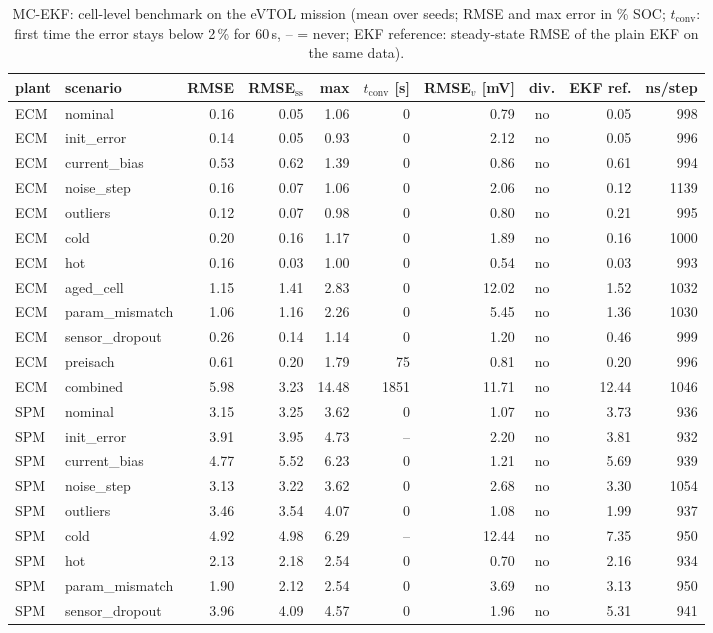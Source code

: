 \begin{table}[H]\centering\footnotesize\setlength{\tabcolsep}{4pt}
\caption{MC-EKF: cell-level benchmark on the eVTOL mission (mean over seeds; RMSE and max error in \% SOC; $t_\mathrm{conv}$: first time the error stays below 2\,\% for 60\,s, -- = never; EKF reference: steady-state RMSE of the plain EKF on the same data).}\label{tab:cell_MCEKF}
\begin{tabular}{llrrrrrcrr}\toprule
plant & scenario & RMSE & RMSE$_\mathrm{ss}$ & max & $t_\mathrm{conv}$ [s] & RMSE$_v$ [mV] & div. & EKF ref. & ns/step \\ \midrule
ECM & nominal & 0.16 & 0.05 & 1.06 & 0 & 0.79 & no & 0.05 & 998 \\
ECM & init\_error & 0.14 & 0.05 & 0.93 & 0 & 2.12 & no & 0.05 & 996 \\
ECM & current\_bias & 0.53 & 0.62 & 1.39 & 0 & 0.86 & no & 0.61 & 994 \\
ECM & noise\_step & 0.16 & 0.07 & 1.06 & 0 & 2.06 & no & 0.12 & 1139 \\
ECM & outliers & 0.12 & 0.07 & 0.98 & 0 & 0.80 & no & 0.21 & 995 \\
ECM & cold & 0.20 & 0.16 & 1.17 & 0 & 1.89 & no & 0.16 & 1000 \\
ECM & hot & 0.16 & 0.03 & 1.00 & 0 & 0.54 & no & 0.03 & 993 \\
ECM & aged\_cell & 1.15 & 1.41 & 2.83 & 0 & 12.02 & no & 1.52 & 1032 \\
ECM & param\_mismatch & 1.06 & 1.16 & 2.26 & 0 & 5.45 & no & 1.36 & 1030 \\
ECM & sensor\_dropout & 0.26 & 0.14 & 1.14 & 0 & 1.20 & no & 0.46 & 999 \\
ECM & preisach & 0.61 & 0.20 & 1.79 & 75 & 0.81 & no & 0.20 & 996 \\
ECM & combined & 5.98 & 3.23 & 14.48 & 1851 & 11.71 & no & 12.44 & 1046 \\
\midrule
SPM & nominal & 3.15 & 3.25 & 3.62 & 0 & 1.07 & no & 3.73 & 936 \\
SPM & init\_error & 3.91 & 3.95 & 4.73 & -- & 2.20 & no & 3.81 & 932 \\
SPM & current\_bias & 4.77 & 5.52 & 6.23 & 0 & 1.21 & no & 5.69 & 939 \\
SPM & noise\_step & 3.13 & 3.22 & 3.62 & 0 & 2.68 & no & 3.30 & 1054 \\
SPM & outliers & 3.46 & 3.54 & 4.07 & 0 & 1.08 & no & 1.99 & 937 \\
SPM & cold & 4.92 & 4.98 & 6.29 & -- & 12.44 & no & 7.35 & 950 \\
SPM & hot & 2.13 & 2.18 & 2.54 & 0 & 0.70 & no & 2.16 & 934 \\
SPM & param\_mismatch & 1.90 & 2.12 & 2.54 & 0 & 3.69 & no & 3.13 & 950 \\
SPM & sensor\_dropout & 3.96 & 4.09 & 4.57 & 0 & 1.96 & no & 5.31 & 941 \\
\bottomrule\end{tabular}\end{table}
